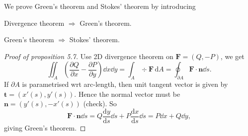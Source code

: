 We prove Green's theorem and Stokes' theorem by introducing 
\begin{proposition}
    Divergence theorem $ \Longrightarrow  $ Green's theorem.
\end{proposition}
\begin{proposition}
    Green's theorem $ \Longrightarrow  $ Stokes' theorem.
\end{proposition}
\begin{proof}[Proof of proposition 5.7]
    Use 2D divergence theorem on $ \mathbf{F} = (Q,-P) $, we get 
    \[
        \iint_{A} \left( \frac{\partial Q}{\partial x}-\frac{\partial P}{\partial y}   \right)\dd x\dd y = \int_{A} \div\mathbf{F} \,\mathrm{d}A  = \oint_{\partial A} \mathbf{F} \cdot \mathbf{n}\dd s.
    \]
    If $ \partial A $ is parametrised wrt arc-length, then unit tangent vector is given by $ \mathbf{t}=(x'(s),y'(s)) $. Hence the normal vector must be $ \mathbf{n} = (y'(s),-x'(s)) $ (check). So 
    \[
        \mathbf{F} \cdot \mathbf{n} \dd s = Q \frac{\mathrm{d}y}{\mathrm{d}s}\dd s+ P \frac{\mathrm{d}x}{\mathrm{d}s}\dd s = P\dd x+Q\dd y,
    \]
    giving Green's theorem.
\end{proof}
